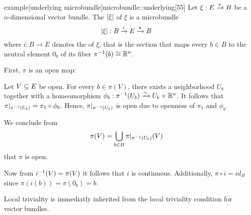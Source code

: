 \begin{mystatement}{example}[underlying microbundle]{microbundle::underlying}[55]
    Let $\xi: E \xto{\pi} B$ be a $n$-dimensional vector bundle.
    The  $\abs{\xi}$ of $\xi$ is a microbundle
    \[ \bundledef{\abs{\xi}}{B}{E}{i}{\pi} \]
    where $i: B \to E$ denotes the  of $\xi$, that is
    the section that maps every $b \in B$ to the neutral element $0_b$
    of its fiber $\inv{\pi}(b) \cong \R^n$.
\end{mystatement}

\begin{myproof}
    First, $\pi$ is an open map:

    Let $V \sub E$ be open.
    For every $b \in \pi(V)$, there exists a neighborhood $U_b$
    together with a homeomorphism $\phi_b: \inv{\pi}(U_b) \isomto U_b \times \R^n$.
    It follows that $\pi\restr{\inv{\pi}(U_b)} = \pi_1 \circ \phi_b$.
    Hence, $\pi\restr{\inv{\pi}(U_b)}$ is open due to openness of $\pi_1$ and $\phi_b$.

    We conclude from
    \[ \pi(V) = \bigcup_{b \in B} \pi\restr{\inv{\pi}(U_b)}(V) \]
    that $\pi$ is open.

    Now from $\inv{i}(V) = \pi(V)$ it follows that $i$ is continuous.
    Additionally, $\pi \circ i = id_B$ since $\pi(i(b)) = \pi(0_b) = b$. 

    Local triviality is immediatly inherited from
    the local triviality condition for vector bundles.
\end{myproof}